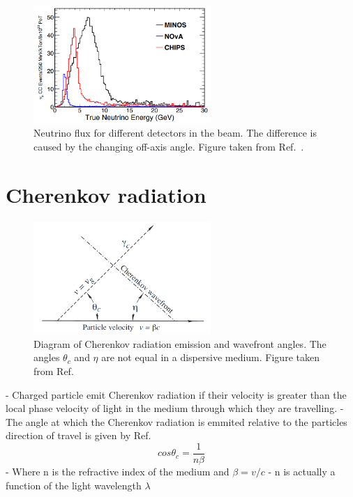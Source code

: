 \begin{figure} %
    \includegraphics[width=0.6\textwidth]{diagrams/4-chips/numi_axis.png}
    \caption[Neutrino flux for different detectors in the \numi beam.]
    {Neutrino flux for different detectors in the \numi beam.
        The difference is caused by the changing off-axis angle.
        Figure taken from Ref.~\cite{adamson2013}.}
    \label{fig:numi_axis}
\end{figure}

\section{Cherenkov radiation} %
\label{sec:chips_cherenkov} %

\begin{figure} %
    \includegraphics[width=0.6\textwidth]{diagrams/4-chips/cherenkov.png}
    \caption[Diagram of Cherenkov radiation.]
    {Diagram of Cherenkov radiation emission and wavefront angles. The angles $\theta_{c}$ and
        $\eta$ are not equal in a dispersive medium. Figure taken from Ref.~\cite{particle2020}
    }
    \label{fig:cherenkov}
\end{figure}

- Charged particle emit Cherenkov radiation if their velocity is greater than the local phase
velocity of light in the medium through which they are travelling.
- The angle at which the Cherenkov radiation is emmited relative to the particles direction of
travel is given by Ref.~\cite{particle2020}
\begin{equation}
    cos\theta_{c} = \frac{1}{n\beta}
\end{equation}
- Where n is the refractive index of the medium and $\beta=v/c$
- n is actually a function of the light wavelength $\lambda$

